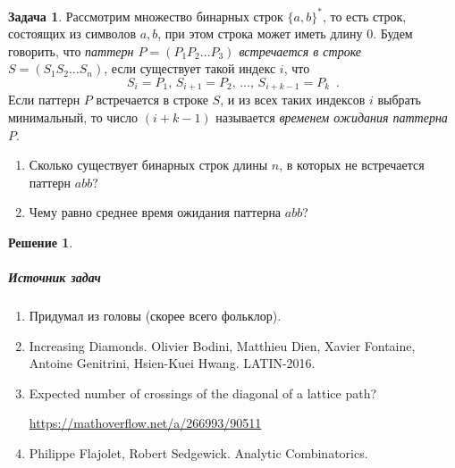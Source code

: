 \documentclass[a5paper]{article}
\theoremstyle{definition}
\newtheorem{problem}{Задача}
\newtheorem*{solution}{Решение}
\begin{document}
\begin{problem} Рассмотрим множество бинарных строк \( \{ a, b \}^\ast \), то
есть строк, состоящих из символов \( a, b \), при этом строка может иметь длину
\( 0 \). Будем говорить, что \emph{паттерн \( P = (P_1 P_2 \ldots P_3) \)
встречается в строке \( S = (S_1 S_2 \ldots S_n) \)}, если существует такой индекс \( i \), что
\begin{equation}
    S_i = P_1, \, 
    S_{i+1} = P_2, \,
    \ldots, \,
    S_{i+k-1} = P_k \enspace .
\end{equation}
Если паттерн \( P \) встречается в строке \( S \), и из всех таких индексов \( i
\) выбрать минимальный, то число \( (i+k-1) \) называется \emph{временем
ожидания паттерна \( P \)}.
\begin{enumerate}
\item Сколько существует бинарных строк длины \( n \), в которых не встречается
паттерн \( abb \)? 
\item Чему равно среднее время ожидания паттерна \( abb \)?
\end{enumerate}
\end{problem}       

\begin{solution}

\end{solution}

\subparagraph*{Источник задач}
\begin{enumerate}
\item Придумал из головы (скорее всего фольклор).
\item Increasing Diamonds. Olivier Bodini, Matthieu Dien, Xavier Fontaine,
Antoine Genitrini, Hsien-Kuei Hwang. LATIN-2016.
\item Expected number of crossings of the diagonal of a lattice path? 

\url{https://mathoverflow.net/a/266993/90511}
\item Philippe Flajolet, Robert Sedgewick. Analytic Combinatorics.
\end{enumerate}
\end{document}
